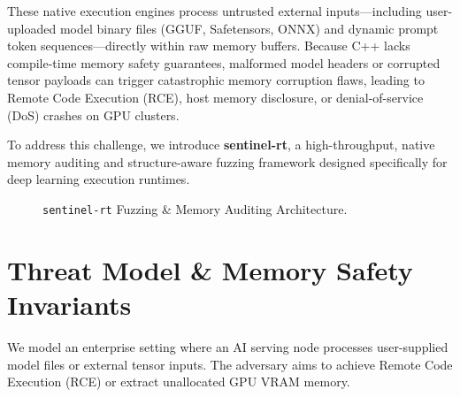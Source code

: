 \documentclass[11pt,a4paper]{article}
\begin{document}
These native execution engines process untrusted external inputs—including user-uploaded model binary files (GGUF, Safetensors, ONNX) and dynamic prompt token sequences—directly within raw memory buffers. Because C++ lacks compile-time memory safety guarantees, malformed model headers or corrupted tensor payloads can trigger catastrophic memory corruption flaws, leading to Remote Code Execution (RCE), host memory disclosure, or denial-of-service (DoS) crashes on GPU clusters.

To address this challenge, we introduce \textbf{sentinel-rt}, a high-throughput, native memory auditing and structure-aware fuzzing framework designed specifically for deep learning execution runtimes.

\begin{figure}[h!]
\centering
{}
\caption{\texttt{sentinel-rt} Fuzzing \& Memory Auditing Architecture.}
\label{fig:fuzz_architecture}
\end{figure}

\section{Threat Model \& Memory Safety Invariants}

We model an enterprise setting where an AI serving node processes user-supplied model files or external tensor inputs. The adversary aims to achieve Remote Code Execution (RCE) or extract unallocated GPU VRAM memory.
\end{document}
